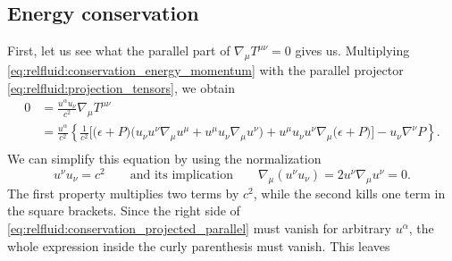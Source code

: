\subsection{Energy conservation}

First, let us see what the parallel part of $\nabla_\mu T^{\mu \nu} = 0$ gives us.
Multiplying \cref{eq:relfluid:conservation_energy_momentum} with the parallel projector \eqref{eq:relfluid:projection_tensors}, we obtain
\begin{equation}
\begin{split}
	0 &= \frac{u^\alpha u_\nu}{c^2} \nabla_\mu T^{\mu \nu} \\
	  &= \frac{u^\alpha}{c^2} \left\{ \frac{1}{c^2} \bigg[ \Big( \epsilon + P \Big) \Big( u_\nu u^\nu \nabla_\mu u^\mu + u^\mu u_\nu \nabla_\mu u^\nu \Big) + u^\mu u_\nu u^\nu \nabla_\mu \Big( \epsilon + P \Big) \bigg] - u_\nu \nabla^\nu P \right\} . \\
\end{split}
\label{eq:relfluid:conservation_projected_parallel}
\end{equation}
We can simplify this equation by using the normalization
\begin{equation}
	u^\nu u_\nu = c^2 
	\qquad \text{and its implication} \qquad
	\nabla_\mu \left( u^\nu u_\nu \right) = 2 u^\nu \nabla_\mu u^\nu = 0 .
\label{eq:relfluid:tricks}
\end{equation}
The first property multiplies two terms by $c^2$, while the second kills one term in the square brackets.
Since the right side of \cref{eq:relfluid:conservation_projected_parallel} must vanish for arbitrary $u^\alpha$, the whole expression inside the curly parenthesis must vanish.
This leaves
